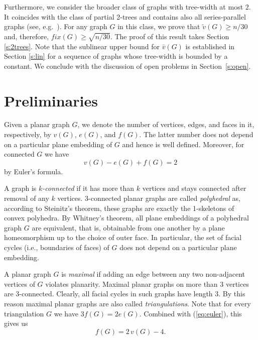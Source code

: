 \documentclass[reqno,12pt]{amsart}
\newcommand{\fix}[1]{\mathit{fix}(#1)}
\newcommand{\lin}[1]{\bar v(#1)}
\newcommand{\free}[1]{\tilde v(#1)}
\newcommand{\refeq}[1]{(\ref{eq:#1})}
\begin{document}
Furthermore, we consider the broader class of graphs with tree-width at most 2.
It coincides with the class of partial 2-trees and contains also all series-parallel graphs
(see, e.g.\ \cite[Sect.\ 8.3]{Bodlaender98}). For any graph $G$ in this class, we prove
that $\free G\ge n/30$ and, therefore, $\fix G\ge\sqrt{n/30}$.
The proof of this result takes Section \ref{s:2trees}.
Note that the sublinear upper bound for $\lin G$ is established in Section \ref{s:lin}
for a sequence of graphs whose tree-width is bounded by a constant.
We conclude with the discussion of open problems in Section~\ref{s:open}.




\section{Preliminaries}\label{s:prel}

Given a planar graph $G$, we denote the number of vertices, edges,
and faces in it, respectively, by $v(G)$, $e(G)$, and $f(G)$. The latter number
does not depend on a particular plane embedding of $G$ and hence is well defined.
Moreover, for connected $G$ we have
\begin{equation}\label{eq:euler}
v(G)-e(G)+f(G)=2
\end{equation}
by Euler's formula. 

A graph is \emph{$k$-connected} if it has more than $k$ vertices and 
stays connected after removal of any $k$ vertices. 
3-connected planar graphs are called \emph{polyhedral}
as, according to Steinitz's theorem, 
these graphs are exactly the 1-skeletons of convex polyhedra.
By Whitney's theorem, all plane embeddings of a polyhedral
graph $G$ are equivalent, that is, obtainable from one another by a plane homeomorphism
up to the choice of outer face. In particular, the set of facial cycles (i.e.,
boundaries of faces) of $G$ does not depend on a particular plane embedding.

A planar graph $G$ is \emph{maximal} if adding an edge between any two 
non-adjacent vertices of $G$ violates planarity. Maximal planar graphs 
on more than 3 vertices are
3-connected. Clearly, all facial cycles in such graphs have length 3.
By this reason maximal planar graphs are also called \emph{triangulations}.
Note that for every triangulation $G$ we have
$
3f(G)=2e(G)
$.
Combined with \refeq{euler}, this gives us
\begin{equation}\label{eq:fv}
f(G)=2\,v(G)-4.
\end{equation}
\end{document}
